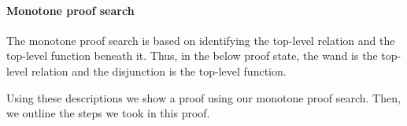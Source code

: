 \documentclass[thesis.tex]{subfiles}
\begin{document}
\paragraph{Monotone proof search}
The monotone proof search is based on identifying the top-level relation and the top-level function beneath it. Thus, in the below proof state, the wand is the top-level relation and the disjunction is the top-level function.
\begin{center}
\end{center}
Using these descriptions we show a proof using our monotone proof search. Then, we outline the steps we took in this proof.
\end{document}
